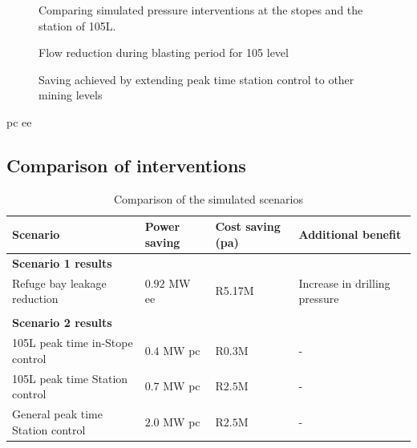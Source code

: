 	\begin{figure}[h!]
		\centering
		
		\caption{Comparing simulated pressure interventions at the stopes and the station of 105L.}
		\label{fig: Station vs stope}
	\end{figure}

\begin{figure}[h!]
	\centering
	
	\caption{Flow reduction during blasting period for 105 level}
	\label{fig: 105 Flow savings}
\end{figure}

\begin{figure}[h!]
	\centering
	
	\caption{Saving achieved by extending peak time station control to other mining levels}
	\label{fig: General station optimise}
\end{figure}

	\gls{pc}  \gls{ee} 
	\subsection{Comparison of interventions}
	
	\begin{table}[h]
		\centering
		\begin{tabular}{p{}
				p{}
				p{}
				p{}}
			\hline 
			 \vspace{0.5em}Scenario  &  \vspace{0.5em}Power saving &  Cost saving (\gls{pa}) &  \vspace{0.5em}Additional benefit  \\
			\hline
			\multicolumn{4}{l}{\textbf{Scenario 1 results}} \\
			Refuge bay leakage reduction & $ 0.92 $ MW \gls{ee}  &  R5.17M & Increase in drilling pressure \\
			 \\
			\multicolumn{4}{l}{\textbf{Scenario 2 results}}  \\
			105L peak time in-Stope control & $ 0.4 $ MW \gls{pc} & R$ 0.3 $M& - \\
			105L peak time Station control & $ 0.7 $ MW \gls{pc} & R$ 2.5 $M& - \\
			General peak time Station control & $ 2.0 $ MW \gls{pc} & R$ 2.5 $M& - \\
			\hline 
		\end{tabular}
		\caption{Comparison of the simulated scenarios}
		\label{Table: B Comparison}
	\end{table}


